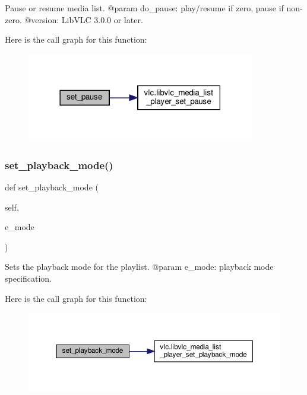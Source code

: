 \begin{DoxyVerb}Pause or resume media list.
@param do_pause: play/resume if zero, pause if non-zero.
@version: LibVLC 3.0.0 or later.
\end{DoxyVerb}
 Here is the call graph for this function\+:
\nopagebreak
\begin{figure}[H]
\begin{center}
\leavevmode
\includegraphics[width=282pt]{classvlc_1_1_media_list_player_ab35d8dc9f1faad46ff204872a225ad49_cgraph}
\end{center}
\end{figure}
\mbox{\label{classvlc_1_1_media_list_player_aad8459f0e126cfbb1a8bd73bef98ac1b}} 
\subsubsection{\texorpdfstring{set\+\_\+playback\+\_\+mode()}{set\_playback\_mode()}}
{\footnotesize\ttfamily def set\+\_\+playback\+\_\+mode (\begin{DoxyParamCaption}\item[{}]{self,  }\item[{}]{e\+\_\+mode }\end{DoxyParamCaption})}

\begin{DoxyVerb}Sets the playback mode for the playlist.
@param e_mode: playback mode specification.
\end{DoxyVerb}
 Here is the call graph for this function\+:
\nopagebreak
\begin{figure}[H]
\begin{center}
\leavevmode
\includegraphics[width=350pt]{classvlc_1_1_media_list_player_aad8459f0e126cfbb1a8bd73bef98ac1b_cgraph}
\end{center}
\end{figure}
\mbox{\label{classvlc_1_1_media_list_player_a26ca7c1c7fcdd35378e7be97727047a6}} 
